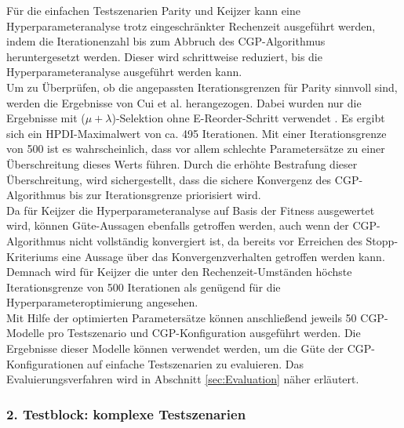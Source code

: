 Für die einfachen Testszenarien Parity und Keijzer kann eine Hyperparameteranalyse trotz eingeschränkter Rechenzeit ausgeführt werden, indem die Iterationenzahl bis zum Abbruch des CGP-Algorithmus heruntergesetzt werden.
Dieser wird schrittweise reduziert, bis die Hyperparameteranalyse ausgeführt werden kann.\\
Um zu Überprüfen, ob die angepassten Iterationsgrenzen für Parity sinnvoll sind, werden die Ergebnisse von Cui et al. herangezogen. Dabei wurden nur die Ergebnisse mit ($\mu + \lambda$)-Selektion ohne E-Reorder-Schritt verwendet \cite{cui_results}.
Es ergibt sich ein HPDI-Maximalwert von ca. 495 Iterationen. 
Mit einer Iterationsgrenze von 500 ist es wahrscheinlich, dass vor allem schlechte Parametersätze zu einer Überschreitung dieses Werts führen.
Durch die erhöhte Bestrafung dieser Überschreitung, wird sichergestellt, dass die sichere Konvergenz des CGP-Algorithmus bis zur Iterationsgrenze priorisiert wird.\\
Da für Keijzer die Hyperparameteranalyse auf Basis der Fitness ausgewertet wird, können Güte-Aussagen ebenfalls getroffen werden, auch wenn der CGP-Algorithmus nicht vollständig konvergiert ist, da bereits vor Erreichen des Stopp-Kriteriums eine Aussage über das Konvergenzverhalten getroffen werden kann.
Demnach wird für Keijzer die unter den Rechenzeit-Umständen höchste Iterationsgrenze von 500 Iterationen als genügend für die Hyperparameteroptimierung angesehen.\\

Mit Hilfe der optimierten Parametersätze können anschließend jeweils 50 CGP-Modelle pro Testszenario und CGP-Konfiguration ausgeführt werden.
Die Ergebnisse dieser Modelle können verwendet werden, um die Güte der CGP-Konfigurationen auf einfache Testszenarien zu evaluieren.
Das Evaluierungsverfahren wird in Abschnitt \ref{sec:Evaluation} näher erläutert.

\subsubsection{2. Testblock: komplexe Testszenarien}
\label{subsub:zweiterTestblock}

